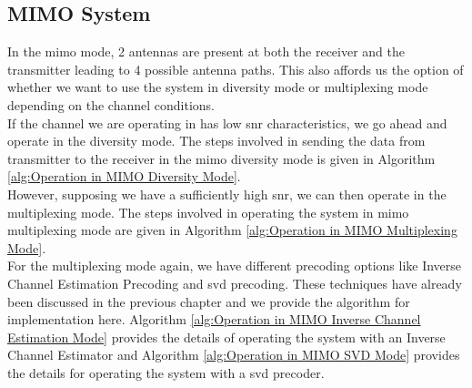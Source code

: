 \subsection{MIMO System}
In the \acrlong{mimo} mode, 2 antennas are present at both the receiver and the transmitter leading to 4 possible antenna paths. This also affords us the option of whether we want to use the system in diversity mode or multiplexing mode depending on the channel conditions.\\
If the channel we are operating in has low \acrshort{snr} characteristics, we go ahead and operate in the diversity mode. The steps involved in sending the data from transmitter to the receiver in the \acrshort{mimo} diversity mode is given in Algorithm \ref{alg:Operation in MIMO Diversity Mode}.\\
However, supposing we have a sufficiently high \acrshort{snr}, we can then operate in the multiplexing mode. The steps involved in operating the system in \acrshort{mimo} multiplexing mode are given in Algorithm \ref{alg:Operation in MIMO Multiplexing Mode}.\\

For the multiplexing mode again, we have different precoding options like Inverse Channel Estimation Precoding and \acrlong{svd} precoding. These techniques have already been discussed in the previous chapter and we provide the algorithm for implementation here. Algorithm \ref{alg:Operation in MIMO Inverse Channel Estimation Mode} provides the details of operating the system with an Inverse Channel Estimator and Algorithm \ref{alg:Operation in MIMO SVD Mode} provides the details for operating the system with a \acrshort{svd} precoder.\\

